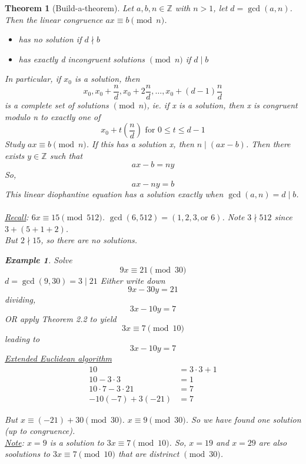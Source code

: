\documentclass[letterpaper]{article}
\newcommand{\ZZ}{\mathbb{Z}}
\newtheorem{theorem}{Theorem}[section]
\newtheorem{example}{Example}[theorem]
\begin{document}
    \begin{theorem} [Build-a-theorem]
        Let $a,b,n\in\ZZ$ with $n>1$, let $d=\gcd(a,n)$.
        Then the linear congruence $ax\equiv b\pmod{n}$. 
        \begin{itemize}
            \item has no solution if $d\nmid b$
            \item has exactly d incongruent solutions $\pmod{n}$ if $d\mid b$
        \end{itemize}
        In particular, if $x_0$ is a solution, then
        \[ 
            x_0, x_0+\frac{n}{d}, x_0+2\frac{n}{d},\dots, x_0+(d-1)\frac{n}{d}
        \]
        is a complete set of solutions $\pmod{n}$, ie. 
        if x is a solution, then x is congruent modulo n to exactly one of 
        \[
            x_0+t(\frac{n}{d}) \text{ for } 0\leq t\leq d-1
        \]
        Study $ax\equiv b\pmod{n}$. If this has a solution x, then
        $n\mid(ax-b)$. Then there exists $y\in\ZZ$ such that
        \[ ax-b=ny \]
        So, 
        \[ ax-ny=b \]
        This linear diophantine equation has a solution exactly when 
        $\gcd(a,n)=d\mid b$. \\\\
        \underline{Recall}: $6x\equiv 15\pmod{512}$.
        $\gcd(6,512)=(1,2,3,\text{or } 6)$. Note $3\nmid 512$ since 
        $3+(5+1+2)$. \\ But $2\nmid 15$, so there are no solutions.

        \begin{example}
            Solve \[ 9x\equiv 21\pmod{30} \]
            $d=\gcd(9,30)=3\mid 21$
            Either write down
            \[ 9x-30y=21 \]
            dividing,
            \[ 3x-10y=7 \]
            OR apply Theorem 2.2 to yield 
            \[ 3x\equiv 7\pmod{10} \] 
            leading to 
            \[ 3x-10y=7 \]
            \underline{Extended Euclidean algorithm}
            \begin{align*}
                10 &= 3\cdot 3+1 \\
                10-3\cdot 3 &= 1 \\
                10\cdot 7 - 3\cdot 21 &= 7 \\
                -10(-7)+3(-21) &= 7
            \end{align*}
            \begin{center}
            \end{center}
            But $x\equiv (-21)+30\pmod{30}$. $x\equiv 9\pmod{30}$. 
            So we have found one solution (up to congruence). \\
            \underline{Note}: $x=9$ is a solution to $3x\equiv 7\pmod{10}$. 
            So, $x=19$ and $x=29$ are also soolutions to $3x\equiv 7\pmod{10}$ 
            that are distrinct $\pmod{30}$.
        \end{example}


\end{theorem}
\end{document}
